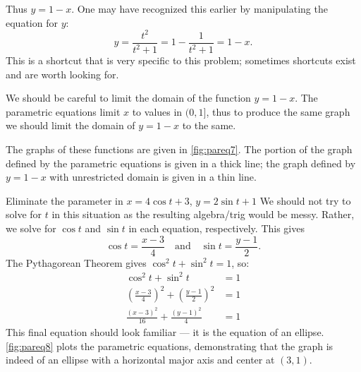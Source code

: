 \begin{example}
Thus $y=1-x$. One may have recognized this earlier by manipulating the equation for $y$:
\[y = \frac{t^2}{t^2+1} = 1-\frac{1}{t^2+1} = 1-x.\]
This is a shortcut that is very specific to this problem; sometimes shortcuts exist and are worth looking for.

We should be careful to limit the domain of the function $y=1-x$. The parametric equations limit $x$ to values in $(0,1]$, thus to produce the same graph we should limit the domain of $y=1-x$ to the same. 

The graphs of these functions are given in \autoref{fig:pareq7}. The portion of the graph defined by the parametric equations is given in a thick line; the graph defined by $y=1-x$ with unrestricted domain is given in a thin line.
\end{example}

\begin{example}\label{ex_pareq8}%
Eliminate the parameter in $x=4\cos t+3$, $y= 2\sin t+1$
\solution
We should not try to solve for $t$ in this situation as the resulting algebra/trig would be messy. Rather, we solve for $\cos t$ and $\sin t$ in each equation, respectively. This gives
\[\cos t = \frac{x-3}{4} \quad \text{and}\quad \sin t=\frac{y-1}{2}.\]
The Pythagorean Theorem gives $\cos^2t+\sin^2t=1$, so:
%
%
\begin{align*}
\cos^2t+\sin^2t &=1 \\
\left(\frac{x-3}{4}\right)^2 +\left(\frac{y-1}{2}\right)^2 &=1\\
\frac{(x-3)^2}{16}+\frac{(y-1)^2}{4} &=1
\end{align*}
This final equation should look familiar --- it is the equation of an ellipse. \autoref{fig:pareq8} plots the parametric equations, demonstrating that the graph is indeed of an ellipse with a horizontal major axis and center at $(3,1)$.
\end{example}

